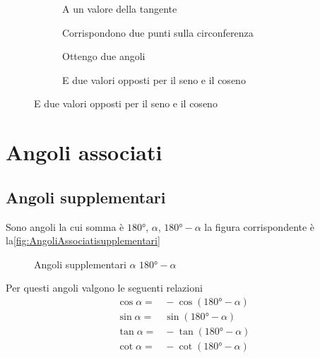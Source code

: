 \begin{figure}
	\begin{subfigure}[b]{.5\linewidth}
		\centering
		\caption{A un valore della tangente}\label{fig:SenoCosenoNototangente1}
	\end{subfigure}%
	\begin{subfigure}[b]{.5\linewidth}
		\centering
		\caption{Corrispondono due punti sulla circonferenza}\label{fig:SenoCosenoNototangente2}
	\end{subfigure}
	\begin{subfigure}[b]{.5\linewidth}
		\centering
		\caption{Ottengo due angoli}\label{fig:SenoCosenoNototangente3}
	\end{subfigure}%
	\begin{subfigure}[b]{.5\linewidth}
		\centering
		\caption{E due valori opposti per il seno e il coseno}\label{fig:SenoCosenoNototangente4}
	\end{subfigure}
	\label{fig:senocosenoNototangentEs1}
\end{figure}
\section{Angoli associati}
\label{sec:goniometriaAngoliAssociati}
\subsection{Angoli supplementari}
Sono angoli la cui somma è $\ang{180}$, $\alpha$, $\ang{180}-\alpha$ la figura corrispondente è la\nobs\vref{fig:AngoliAssociatisupplementari}
\begin{figure}
	\centering

	\caption{Angoli supplementari $\alpha$ $\ang{180}-\alpha$}
	\label{fig:AngoliAssociatisupplementari}
\end{figure}
Per questi angoli valgono le seguenti relazioni
\begin{align*}
\cos\alpha=&{}-\cos(\ang{180}-\alpha)\\
\sin\alpha=&{}\sin(\ang{180}-\alpha)\\
\tan\alpha=&{}-\tan(\ang{180}-\alpha)\\
\cot\alpha=&{}-\cot(\ang{180}-\alpha)
\end{align*}
